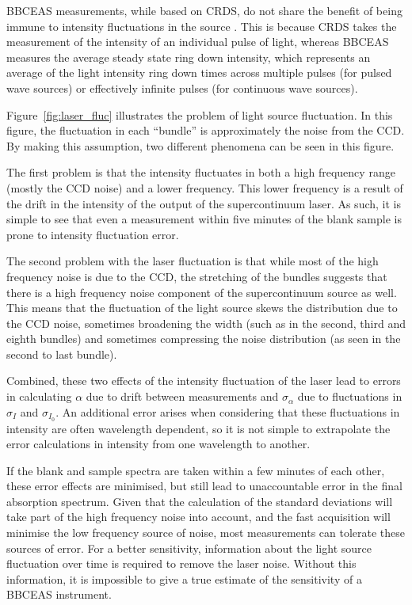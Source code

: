 \ac{BBCEAS} measurements, while based on \ac{CRDS}, do not share the benefit
of being immune to intensity fluctuations in the source \cite{Berden:2009wk}.
This is because \ac{CRDS} takes the measurement of the intensity of an
individual pulse of light, whereas \ac{BBCEAS} measures the average steady
state ring down intensity, which represents an average of the light intensity
ring down times across multiple pulses (for pulsed wave sources) or
effectively infinite pulses (for continuous wave sources).

Figure~\ref{fig:laser_fluc} illustrates the problem of light source
fluctuation. In this figure, the fluctuation in each ``bundle'' is
approximately the noise from the \ac{CCD}. By making this assumption, two
different phenomena can be seen in this figure.

The first problem is that the intensity fluctuates in both a high frequency
range (mostly the \ac{CCD} noise) and a lower frequency. This lower frequency
is a result of the drift in the intensity of the output of the supercontinuum
laser. As such, it is simple to see that even a measurement within five
minutes of the blank sample is prone to intensity fluctuation error.

The second problem with the laser fluctuation is that while most of the
high frequency noise is due to the \ac{CCD}, the stretching of the bundles
suggests that there is a high frequency noise component of the supercontinuum
source as well. This means that the fluctuation of the light source skews the
distribution due to the \ac{CCD} noise, sometimes broadening the width (such
as in the second, third and eighth bundles) and sometimes compressing the
noise distribution (as seen in the second to last bundle).

Combined, these two effects of the intensity fluctuation of the laser lead
to errors in calculating $\alpha$ due to drift between measurements and
$\sigma_{\alpha}$ due to fluctuations in $\sigma_{I}$ and $\sigma_{I_0}$. An
additional error arises when considering that these fluctuations in intensity
are often wavelength dependent, so it is not simple to extrapolate the error
calculations in intensity from one wavelength to another.

If the blank and sample spectra are taken within a few minutes of each other,
these error effects are minimised, but still lead to unaccountable error in
the final absorption spectrum. Given that the calculation of the standard
deviations will take part of the high frequency noise into account, and
the fast acquisition will minimise the low frequency source of noise, most
measurements can tolerate these sources of error. For a better sensitivity,
information about the light source fluctuation over time is required to remove
the laser noise. Without this information, it is impossible to give a true
estimate of the sensitivity of a \ac{BBCEAS} instrument.



